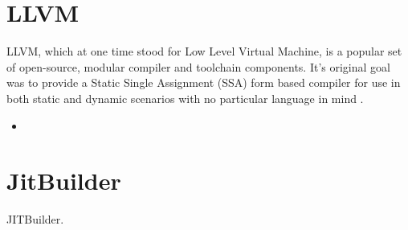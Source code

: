 \section{LLVM}
\label{sec:llvm}
LLVM, which at one time stood for Low Level Virtual Machine, is a popular set of open-source, modular compiler and toolchain components.
It's original goal was to provide a Static Single Assignment (SSA) form based compiler for use in both static and dynamic scenarios with no particular language in mind \cite{LLVM_Paper}.
\begin{itemize}
    \item 
\end{itemize}
\section{JitBuilder}
\label{sec:jitbuilder}
JITBuilder.
